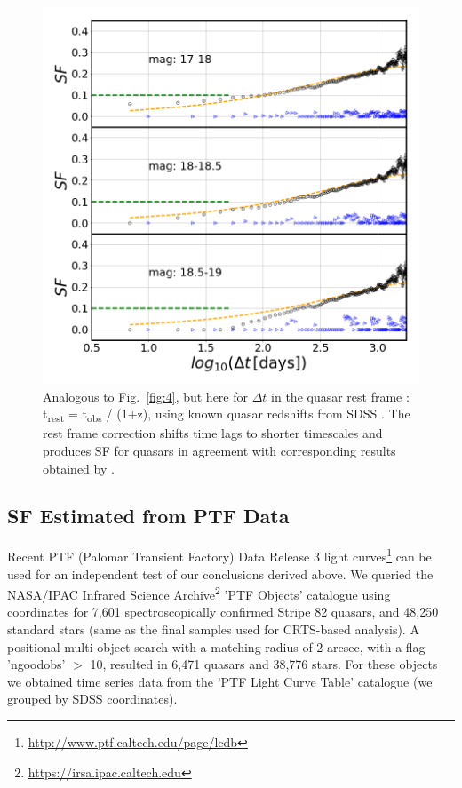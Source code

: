\documentclass[fleqn,usenatbib]{mnras}
\begin{document}
\begin{figure}

\vskip -0.15in
\includegraphics[width=1.1\columnwidth, center]{Fig_5.png}
\caption{Analogous to Fig.~\ref{fig:4}, but here for $\Delta t$ in the quasar rest frame : t\textsubscript{rest} = t\textsubscript{obs} / (1+z), using known quasar redshifts from SDSS \citep{macleod2010}.  The rest frame correction shifts time lags to shorter timescales and produces SF for quasars in agreement with corresponding results obtained by \citep{macleod2010}.}
\label{fig:5}
\end{figure}


\subsection{SF Estimated from PTF Data}

Recent PTF (Palomar Transient Factory) Data Release 3 light curves\footnote{\url{http://www.ptf.caltech.edu/page/lcdb}}
can be used for an independent test of our conclusions derived above. We queried the NASA/IPAC Infrared Science 
Archive\footnote{\url{https://irsa.ipac.caltech.edu}} 'PTF Objects' catalogue using coordinates for 7,601 spectroscopically
confirmed Stripe 82 quasars, and 48,250 standard stars (same as the final samples used for CRTS-based analysis).
A positional multi-object search with a matching radius of 2 arcsec, with a flag 'ngoodobs' $>$ 10,  resulted in  
6,471 quasars and 38,776 stars.  For these objects we obtained time series data from the 'PTF Light Curve Table' catalogue
(we grouped by SDSS coordinates). 
\end{document}
